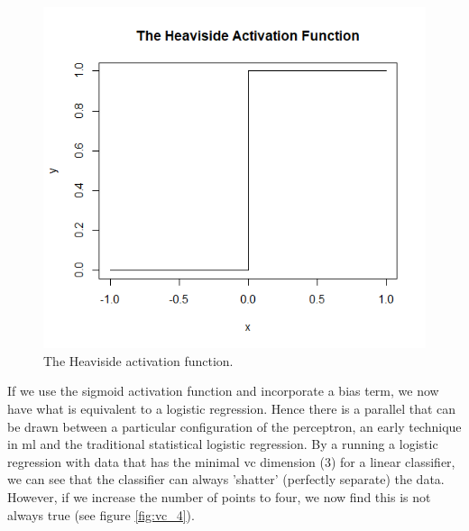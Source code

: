 \begin{figure}
    \includegraphics[scale=0.5]{figs/heavi.png}
    \caption{The Heaviside activation function.}
    \label{fig:heavi_function}
\end{figure}

If we use the sigmoid activation function and incorporate a bias term, we now have what is equivalent to a logistic regression. Hence there is a parallel that can be drawn between a particular configuration of the perceptron, an early technique in \gls{ml} and the traditional statistical logistic regression. By a running a logistic regression with data that has the minimal \gls{vc} dimension (3) for a linear classifier, we can see that the classifier can always 'shatter' (perfectly separate) the data. However, if we increase the number of points to four, we now find this is not always true (see figure \ref{fig:vc_4}).

